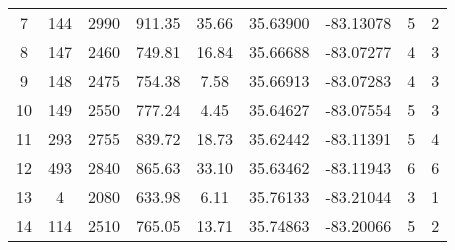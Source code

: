 \begin{table}[p]
\begin{flushleft}
\begin{tabular}{ccccccccc}
7   & 144                                                 & 2990                                                          & 911.35                                                       & 35.66 & 35.63900 & -83.13078 & 5                                                                                      & 2 \\ 
8   & 147                                                 & 2460                                                          & 749.81                                                       & 16.84 & 35.66688 & -83.07277 & 4                                                                                      & 3 \\ 
9   & 148                                                 & 2475                                                          & 754.38                                                       & 7.58   & 35.66913 & -83.07283 & 4                                                                                      & 3 \\ 
10 & 149                                                 & 2550                                                          & 777.24                                                       & 4.45   & 35.64627 & -83.07554 & 5                                                                                      & 3 \\ 
11 & 293                                                 & 2755                                                          & 839.72                                                       & 18.73 & 35.62442 & -83.11391 & 5                                                                                      & 4 \\ 
12 & 493                                                 & 2840                                                          & 865.63                                                       & 33.10 & 35.63462 & -83.11943 & 6                                                                                      & 6 \\ 
13 & 4                                                     & 2080                                                          & 633.98                                                       & 6.11   & 35.76133 & -83.21044 & 3                                                                                      & 1 \\ 
14 & 114                                                 & 2510                                                          & 765.05                                                       & 13.71 & 35.74863 & -83.20066 & 5                                                                                      & 2 \\ 

\end{tabular}
\end{flushleft}
\end{table}
